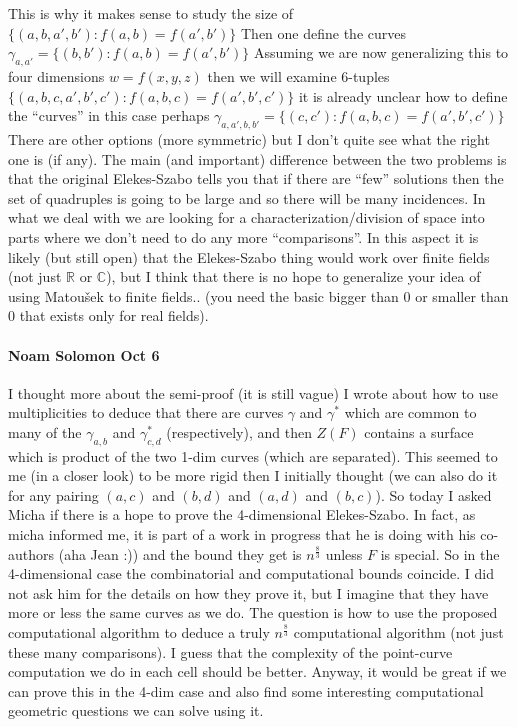 This is why it makes sense to study the size of $\{(a,b,a',b'): f(a,b)=f(a',b')\}$
Then one define the curves $\gamma_{a,a'} = \{(b,b'): f(a,b)=f(a',b')\}$
Assuming we are now generalizing this to four dimensions
$w=f(x,y,z)$
then we will examine 6-tuples $\{(a,b,c,a',b',c'): f(a,b,c)=f(a',b',c')\}$
it is already unclear how to define the ``curves'' in this case
perhaps $\gamma_{a,a',b,b'} = \{(c,c'): f(a,b,c)=f(a',b',c')\}$
There are other options (more symmetric) but I don't quite see what the
right one is (if any).
The main (and important) difference between the two problems is that the
original Elekes-Szabo tells you that if there are ``few'' solutions then
the set of quadruples is going to be large and so there will be many
incidences. In what we deal with we are looking for a
characterization/division of space into parts where we don't need to do any
more ``comparisons''. In this aspect it is likely (but still open) that the
Elekes-Szabo thing would work over finite fields (not just $\mathbb{R}$ or
$\mathbb{C}$), but I
think that there is no hope to generalize your idea of using Matou\v{s}ek to
finite fields.. (you need the basic bigger than 0 or smaller than 0 that
exists only for real fields).

\paragraph{Noam Solomon Oct 6}
I thought more about the semi-proof (it is still vague) I wrote about how
to use multiplicities to deduce that there are curves $\gamma$ and $\gamma^*$
which are common to many of the $\gamma_{a,b}$ and $\gamma^*_{c,d}$
(respectively), and then $Z(F)$ contains a surface which is product of the
two 1-dim curves (which are separated). This seemed to me (in a closer
look) to be more rigid then I initially thought (we can also do it for any
pairing $(a,c)$ and $(b,d)$ and $(a,d)$ and $(b,c)$).
So today I asked Micha if there is a hope to prove the 4-dimensional
Elekes-Szabo.
In fact, as micha informed me, it is part of a work in progress that he is
doing with his co-authors (aha Jean :)) and the bound they get is
$n^{\frac{8}{3}}$
unless $F$ is special. So in the 4-dimensional case the combinatorial and
computational bounds coincide.
I did not ask him for the details on how they prove it, but I imagine that
they have more or less the same curves as we do.
The question is how to use the proposed computational algorithm to deduce a
truly $n^{\frac{8}{3}}$ computational algorithm (not just these many comparisons). I
guess that the complexity of the point-curve computation we do in each cell
should be better.
Anyway, it would be great if we can prove this in the 4-dim case and also
find some interesting computational geometric questions we can solve using
it.

